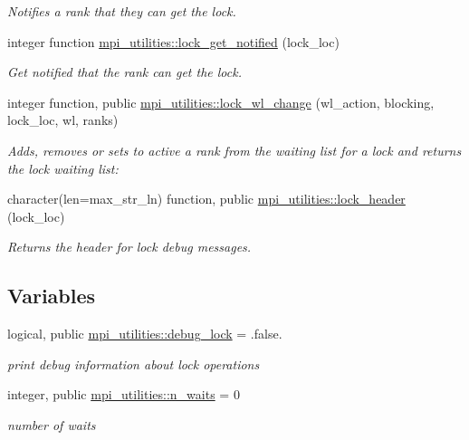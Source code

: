 \begin{DoxyCompactItemize}
\begin{DoxyCompactList}\small\item\em Notifies a rank that they can get the lock. \end{DoxyCompactList}\item 
integer function \hyperlink{namespacempi__utilities_a17c39b0498528e2532c8347b0b7dec86}{mpi\+\_\+utilities\+::lock\+\_\+get\+\_\+notified} (lock\+\_\+loc)
\begin{DoxyCompactList}\small\item\em Get notified that the rank can get the lock. \end{DoxyCompactList}\item 
integer function, public \hyperlink{namespacempi__utilities_a3b0349e5ec825e14083e3126c3e7ba65}{mpi\+\_\+utilities\+::lock\+\_\+wl\+\_\+change} (wl\+\_\+action, blocking, lock\+\_\+loc, wl, ranks)
\begin{DoxyCompactList}\small\item\em Adds, removes or sets to active a rank from the waiting list for a lock and returns the lock waiting list\+: \end{DoxyCompactList}\item 
character(len=max\+\_\+str\+\_\+ln) function, public \hyperlink{namespacempi__utilities_abe5bf3ae3b6a06eda18c2f4d62ac09c5}{mpi\+\_\+utilities\+::lock\+\_\+header} (lock\+\_\+loc)
\begin{DoxyCompactList}\small\item\em Returns the header for lock debug messages. \end{DoxyCompactList}\end{DoxyCompactItemize}
\subsection*{Variables}
\begin{DoxyCompactItemize}
\item 
logical, public \hyperlink{namespacempi__utilities_a98291c400747762ea4e3f0d751c5d5f5}{mpi\+\_\+utilities\+::debug\+\_\+lock} = .false.
\begin{DoxyCompactList}\small\item\em print debug information about lock operations \end{DoxyCompactList}\item 
integer, public \hyperlink{namespacempi__utilities_a38a87fa6a7efbd985592bbef4750f02b}{mpi\+\_\+utilities\+::n\+\_\+waits} = 0
\begin{DoxyCompactList}\small\item\em number of waits \end{DoxyCompactList}\end{DoxyCompactItemize}
